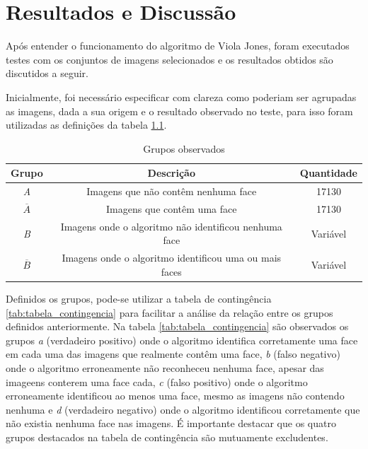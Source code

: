 \chapter{Resultados e Discussão}\label{cap:resultados}

Após entender o funcionamento do algoritmo de Viola Jones, foram executados testes com os conjuntos de imagens selecionados e os resultados obtidos são discutidos a seguir.

Inicialmente, foi necessário especificar com clareza como poderiam ser agrupadas as imagens, dada a sua origem e o resultado observado no teste, para isso foram utilizadas as definições da tabela \ref{tab:grupos-images}. 

\begin{table}[htbp]
    \caption{Grupos observados}
    \label{tab:grupos-images}
    \centering
    \begin{tabular}{ccc}\hline\hline
        \textbf{Grupo} & \textbf{Descrição} & \textbf{Quantidade} \\\hline
        \textit{A} & Imagens que não contêm nenhuma face & 17130 \\
        $\overline{A}$ & Imagens que contêm uma face & 17130 \\
        \textit{B} & Imagens onde o algoritmo não identificou nenhuma face & Variável \\
        $\overline{B}$ & Imagens onde o algoritmo identificou uma ou mais faces & Variável \\
    \hline\hline
    \end{tabular}
\end{table}

Definidos os grupos, pode-se utilizar a tabela de contingência \ref{tab:tabela_contingencia} para facilitar a análise da relação entre os grupos definidos anteriormente. Na tabela \ref{tab:tabela_contingencia} são observados os grupos \textit{a} (verdadeiro positivo) onde o algoritmo identifica corretamente uma face em cada uma das imagens que realmente contêm uma face, \textit{b} (falso negativo) onde o algoritmo erroneamente não reconheceu nenhuma face, apesar das imageens conterem uma face cada, \textit{c} (falso positivo) onde o algoritmo erroneamente identificou ao menos uma face, mesmo as imagens não contendo nenhuma e \textit{d} (verdadeiro negativo) onde o algoritmo identificou corretamente que não existia nenhuma face nas imagens. É importante destacar que os quatro grupos destacados na tabela de contingência são mutuamente excludentes. \cite{Dougherty:2012:PRC:2553126}

